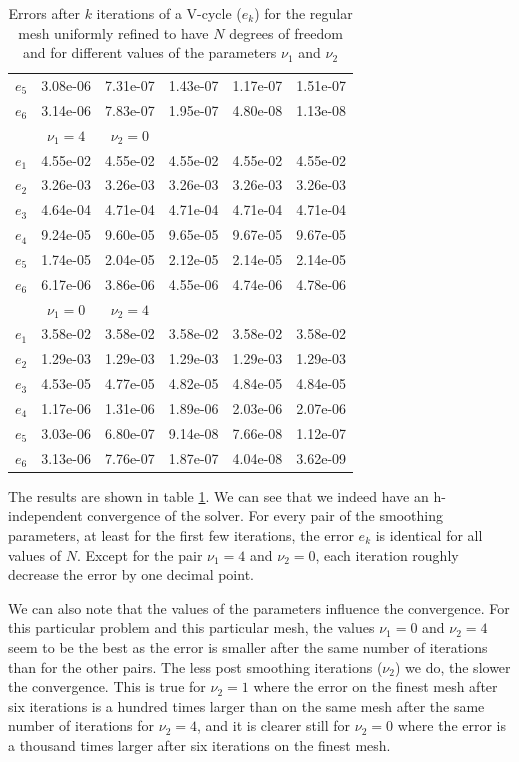 \begin{table}
\begin{tabular}{c|ccccc}
  $e_5$ & 3.08e-06 &	7.31e-07 &	1.43e-07 &	1.17e-07 &	1.51e-07\\
  $e_6$ & 3.14e-06 &	7.83e-07 &	1.95e-07 &	4.80e-08 &	1.13e-08\\
  \hline
   & $\nu_1=4$ & $\nu_2=0$ & & &\\
  \hline
  $e_1$ & 4.55e-02 &	4.55e-02 &	4.55e-02 &	4.55e-02 &	4.55e-02\\
  $e_2$ & 3.26e-03 &	3.26e-03 &	3.26e-03 &	3.26e-03 &	3.26e-03\\
  $e_3$ & 4.64e-04 &	4.71e-04 &	4.71e-04 &	4.71e-04 &	4.71e-04\\
  $e_4$ & 9.24e-05 &	9.60e-05 &	9.65e-05 &	9.67e-05 &	9.67e-05\\
  $e_5$ & 1.74e-05 &	2.04e-05 &	2.12e-05 &	2.14e-05 &	2.14e-05\\
  $e_6$ & 6.17e-06 &	3.86e-06	& 4.55e-06	& 4.74e-06 &	4.78e-06\\
  \hline
  & $\nu_1=0$ & $\nu_2=4$ & & &\\
  \hline
  $e_1$ & 3.58e-02 &	3.58e-02 &	3.58e-02 &	3.58e-02 &	3.58e-02\\
  $e_2$ & 1.29e-03 &	1.29e-03 &	1.29e-03 &	1.29e-03 &	1.29e-03\\
  $e_3$ & 4.53e-05 &	4.77e-05 &	4.82e-05 &	4.84e-05 &	4.84e-05\\
  $e_4$ & 1.17e-06 &	1.31e-06 &	1.89e-06 &	2.03e-06 &	2.07e-06\\
  $e_5$ & 3.03e-06 &	6.80e-07 &	9.14e-08 &	7.66e-08 &	1.12e-07\\
  $e_6$ & 3.13e-06 &	7.76e-07 &	1.87e-07 &	4.04e-08 &	3.62e-09\\
  \hline
\end{tabular}
\caption{Errors after $k$ iterations of a V-cycle ($e_k$) for the regular mesh uniformly refined to have $N$ degrees of freedom and for different values of the parameters $\nu_1$ and $\nu_2$}
\label{multi_err_nu}
\end{table}

The results are shown in table \ref{multi_err_nu}. We can see that we indeed have an h-independent convergence of the solver. For every pair of the smoothing parameters, at least for the first few iterations, the error $e_k$ is identical for all values of $N$. Except for the pair $\nu_1 = 4$ and $\nu_2 = 0$, each iteration roughly decrease the error by one decimal point.

We can also note that the values of the parameters influence the convergence. For this particular problem and this particular mesh, the values $\nu_1 = 0$ and  $\nu_2 = 4$ seem to be the best as the error is smaller after the same number of iterations than for the other pairs. The less post smoothing iterations ($\nu_2$) we do, the slower the convergence. This is true for $\nu_2 = 1$ where the error on the finest mesh after six iterations is a hundred times larger than on the same mesh after the same number of iterations for $\nu_2=4$, and it is clearer still for $\nu_2=0$ where the error is a thousand times larger after six iterations on the finest mesh.


